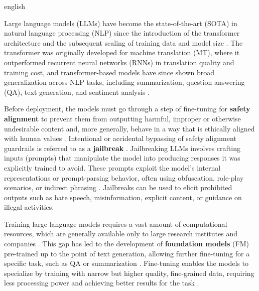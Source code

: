 \begin{otherlanguage*}{english}

Large language models (LLMs) have become the state-of-the-art (SOTA) in natural language processing (NLP) since the introduction of the transformer architecture \cite{vaswaniAttentionAllYou2023} and the subsequent scaling of training data and model size \cite{kaplanScalingLawsNeural, raeScalingLanguageModels2022, hoffmannTrainingComputeoptimalLarge2022}. The transformer was originally developed for machine translation (MT), where it outperformed recurrent neural networks (RNNs) in translation quality and training cost, and transformer-based models have since shown broad generalization across NLP tasks, including summarization, question answering (QA), text generation, and sentiment analysis \cite{devlinBERTPretrainingDeep2019, radfordLanguageModelsAre, weiEmergentAbilitiesLarge2022}. 

Before deployment, the models must go through a step of fine-tuning for \textbf{safety alignment} to prevent them from outputting harmful, improper or otherwise undesirable content and, more generally, behave in a way that is ethically aligned with human values \cite{zieglerFineTuningLanguageModels2020, ganguliRedTeamingLanguage2022, ouyangTrainingLanguageModels2022, jiAIAlignmentComprehensive2025}. Intentional or accidental bypassing of safety alignment guardrails is referred to as a \textbf{jailbreak} \cite{ManyshotJailbreakingProceedings}. Jailbreaking LLMs involves crafting inputs (prompts) that manipulate the model into producing responses it was explicitly trained to avoid. These prompts exploit the model’s internal representations or prompt-parsing behavior, often using obfuscation, role-play scenarios, or indirect phrasing \cite{abdaliSecuringLargeLanguage2024a}. Jailbreaks can be used to elicit prohibited outputs such as hate speech, misinformation, explicit content, or guidance on illegal activities.

Training large language models requires a vast amount of computational resources, which are generally available only to large research institutes and companies \cite{kaplanScalingLawsNeural, raeScalingLanguageModels2022, hoffmannTrainingComputeoptimalLarge2022}. This gap has led to the development of \textbf{foundation models} (FM) pre-trained up to the point of text generation, allowing further fine-tuning for a specific task, such as QA or summarization \cite{touvronLLaMAOpenEfficient2023, 
jiangMistral7B2023, grattafioriLlama3Herd2024}. Fine-tuning enables the models to specialize by training with narrow but higher quality, fine-grained data, requiring less processing power and achieving better results for the task \cite{weiFinetunedLanguageModels2022}.


\end{otherlanguage*}
